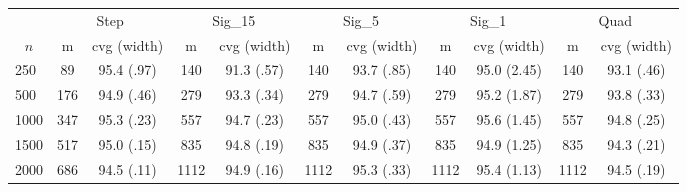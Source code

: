 \documentclass{article}
\begin{document}
\begin{tabular}{lcccccccccc}
   \toprule
 
           & \multicolumn{2}{c}{Step}& \multicolumn{2}{c}{Sig\_15}& \multicolumn{2}{c}{Sig\_5}& \multicolumn{2}{c}{Sig\_1}& \multicolumn{2}{c}{Quad} \\ 
             \cmidrule(l{2pt}r{2pt}){2-3} \cmidrule(l{2pt}r{2pt}){4-5} \cmidrule(l{2pt}r{2pt}){6-7} \cmidrule(l{2pt}r{2pt}){8-9}  \cmidrule(l{2pt}r{2pt}){10-11} 
             \multicolumn{1}{c}{$n$} & \multicolumn{1}{c}{m}& \multicolumn{1}{c}{cvg (width)}& \multicolumn{1}{c}{m}& \multicolumn{1}{c}{cvg (width)}& \multicolumn{1}{c}{m}& \multicolumn{1}{c}{cvg (width)}& \multicolumn{1}{c}{m}& \multicolumn{1}{c}{cvg (width)}& \multicolumn{1}{c}{m}& \multicolumn{1}{c}{cvg (width)} \\ \midrule 
        250 & 89 & 95.4 (.97) & 140 & 91.3 (.57) & 140 & 93.7 (.85) & 140 & 95.0 (2.45) & 140 & 93.1 (.46) \\ 
  500 & 176 & 94.9 (.46) & 279 & 93.3 (.34) & 279 & 94.7 (.59) & 279 & 95.2 (1.87) & 279 & 93.8 (.33) \\ 
  1000 & 347 & 95.3 (.23) & 557 & 94.7 (.23) & 557 & 95.0 (.43) & 557 & 95.6 (1.45) & 557 & 94.8 (.25) \\ 
  1500 & 517 & 95.0 (.15) & 835 & 94.8 (.19) & 835 & 94.9 (.37) & 835 & 94.9 (1.25) & 835 & 94.3 (.21) \\ 
  2000 & 686 & 94.5 (.11) & 1112 & 94.9 (.16) & 1112 & 95.3 (.33) & 1112 & 95.4 (1.13) & 1112 & 94.5 (.19) \\ 
   \hline
\end{tabular}
\end{document}
